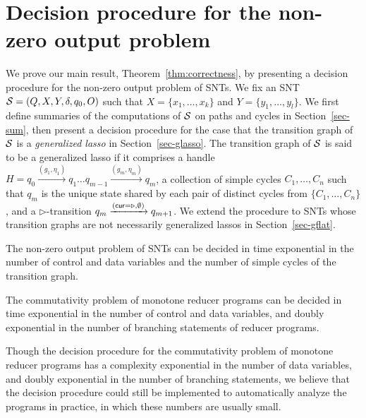 
\section{Decision procedure for the non-zero output problem}\label{sec:dec-snt}
%
We prove our main result, Theorem~\ref{thm:correctness}, by presenting a decision procedure for the non-zero output problem of SNTs. We fix an SNT ${\mathcal{S} } = (Q,X,Y,\delta,q_0,O)$ such that $X=\{ x_1,\dots, x_k\}$ and $Y = \{y_1,\dots,y_l\}$. 
We first define summaries of the computations of ${\mathcal{S} }$ on paths and cycles in Section~\ref{sec-sum}, then present a decision procedure for the case that the transition graph of ${\mathcal{S} }$ is a \emph{generalized lasso} in Section~\ref{sec-glasso}. The transition graph of ${\mathcal{S} }$ is said to be a generalized lasso if it comprises a handle $H=q_0 \xrightarrow{(g_1,\eta_1)} q_1 \dots q_{m-1} \xrightarrow{(g_m,\eta_m)} q_{m}$, a collection of simple cycles $C_1,\dots,C_n$ such that $q_m$ is the unique state shared by each pair of distinct cycles from $\{C_1,\dots,C_n\}$, and a $\triangleright$-transition $q_m \xrightarrow{(\mathsf{cur} = \triangleright, \emptyset)} q_{m+1}$. We extend the procedure to SNTs whose transition graphs are not necessarily generalized lassos in Section~\ref{sec-gflat}. 


\begin{theorem}\label{thm:correctness}
The non-zero output problem of SNTs can be decided in time exponential in the number of control and data variables and the number of simple cycles of the transition graph.
\end{theorem}

\begin{corollary}\label{cor:snt-dec-proc}
The commutativity problem of  monotone reducer programs can be decided in time exponential in the number of control and data variables, and doubly exponential in the number of branching statements of reducer programs. 
\end{corollary}

\begin{remark}
Though the decision procedure for the commutativity problem of monotone reducer programs has a complexity exponential in the number of data variables, and doubly exponential in the number of branching statements, we believe that the decision procedure could still be implemented to automatically analyze the programs in practice, in which these numbers are usually small. 
\end{remark}



